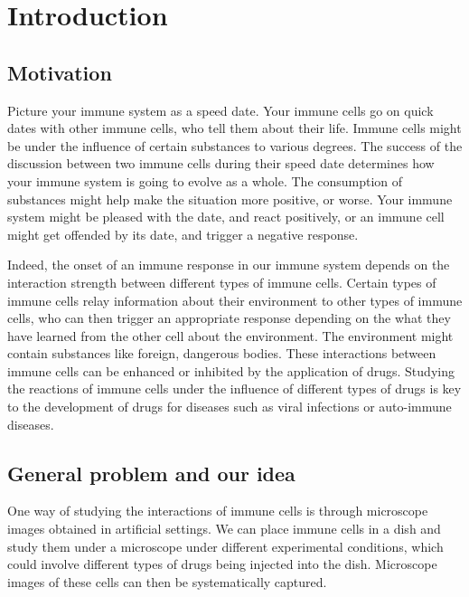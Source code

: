 \chapter{Introduction}

\section{Motivation}

Picture your immune system as a speed date. Your immune cells go on quick dates with other immune cells, who tell them about their life. Immune cells might be under the influence of certain substances to various degrees. The success of the discussion between two immune cells during their speed date determines how your immune system is going to evolve as a whole. The consumption of substances might help make the situation more positive, or worse. Your immune system might be pleased with the date, and react positively, or an immune cell might get offended by its date, and trigger a negative response. %


Indeed, the onset of an immune response in our immune system depends on the interaction strength between different types of immune cells. Certain types of immune cells relay information about their environment to other types of immune cells, who can then trigger an appropriate response depending on the what they have learned from the other cell about the environment. The environment might contain substances like foreign, dangerous bodies. These interactions between immune cells can be enhanced or inhibited by the application of drugs. Studying the reactions of immune cells under the influence of different types of drugs is key to the development of drugs for diseases such as viral infections or auto-immune diseases.

\section{General problem and our idea}

One way of studying the interactions of immune cells is through microscope images obtained in artificial settings. We can place immune cells in a dish and study them under a microscope under different experimental conditions, which could involve different types of drugs being injected into the dish. Microscope images of these cells can then be systematically captured.

